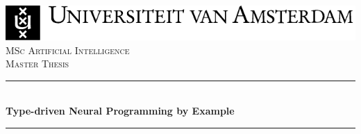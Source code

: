 
\newcommand{\red}[1]{{\color{red}{#1}}}




\begin{titlepage}

\newcommand{\HRule}{\rule{\linewidth}{0.5mm}} %
\center %
 

\includegraphics[width=\linewidth]{figures/uva.pdf}\\[2.5cm]
\textsc{\Large MSc Artificial Intelligence}\\[0.2cm]
\textsc{\Large Master Thesis}\\[0.5cm] 


\HRule \\[0.4cm]
{ \huge \bfseries
    Type-driven Neural Programming by Example \\
}%
\HRule \\[0.5cm]
 


\end{titlepage}
